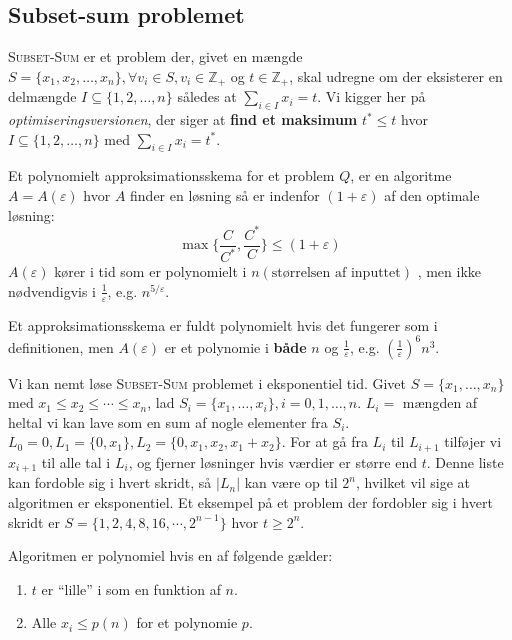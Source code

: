 \subsection{Subset-sum problemet}%
\label{subsec:subsetsumproblem}

\textsc{Subset-Sum} er et problem der, givet en mængde $S = \{x_{1}, x_{2}, \ldots, x_{n}\}, \forall v_{i} \in S, v_{i} \in \mathbb{Z}_{+}$ og $t \in \mathbb{Z}_{+}$, skal udregne om der eksisterer en delmængde $I \subseteq \{1, 2, \ldots, n\}$ således at $\sum_{i \in I}x_{i} = t$. Vi kigger her på \textit{optimiseringsversionen}, der siger at \textbf{find et maksimum} $t^{*} \le t$ hvor $I \subseteq \{1, 2, \ldots, n\}$ med $\sum_{i \in I} x_{i} = t^{*}$.

\begin{definition}[Approksimationsskema]
  Et polynomielt approksimationsskema for et problem $Q$, er en algoritme $A = A(\varepsilon)$ hvor $A$ finder en løsning så er indenfor $(1+\varepsilon)$ af den optimale løsning:
  \begin{equation*}
\max\{\frac{C}{C^{*}}, \frac{C^{*}}{C}\} \le (1+ \varepsilon)
\end{equation*}
$A(\varepsilon)$ kører i tid som er polynomielt i $n(\text{størrelsen af inputtet})$ , men ikke nødvendigvis i $\frac{1}{\varepsilon}$, e.g. $n^{5/\varepsilon}$.
\end{definition}

Et approksimationsskema er fuldt polynomielt hvis det fungerer som i definitionen, men $A(\varepsilon)$ er et polynomie i \textbf{både} $n$ og $\frac{1}{\varepsilon}$, e.g. $\left( \frac{1}{\varepsilon} \right)^{6}n^{3}$.

Vi kan nemt løse \textsc{Subset-Sum} problemet i eksponentiel tid. Givet $S = \{x_{1}, \ldots, x_{n}\}$ med $x_{1} \le x_{2} \le \cdots \le x_{n}$, lad $S_{i} = \{x_{1}, \ldots, x_{i}\}, i = 0, 1, \ldots, n$. $L_{i} = $ mængden af heltal vi kan lave som en sum af nogle elementer fra $S_{i}$. $L_{0} = 0, L_{1} = \{0, x_{1}\}, L_{2} = \{0, x_{1}, x_{2}, x_{1}+x_{2}\}$. For at gå fra $L_{i}$ til $L_{i+1}$ tilføjer vi $x_{i+1}$ til alle tal i $L_{i}$, og fjerner løsninger hvis værdier er større end $t$. Denne liste kan fordoble sig i hvert skridt, så $|L_{n}|$ kan være op til $2^{n}$, hvilket vil sige at algoritmen er eksponentiel. Et eksempel på et problem der fordobler sig i hvert skridt er $S= \{1, 2, 4, 8, 16, \cdots, 2^{n-1}\}$ hvor $t \ge 2^{n}$.

Algoritmen er polynomiel hvis en af følgende gælder:
\begin{enumerate}
  \item $t$ er ``lille'' i som en funktion af $n$.
  \item Alle $x_{i} \le p(n)$ for et polynomie $p$.
\end{enumerate}

